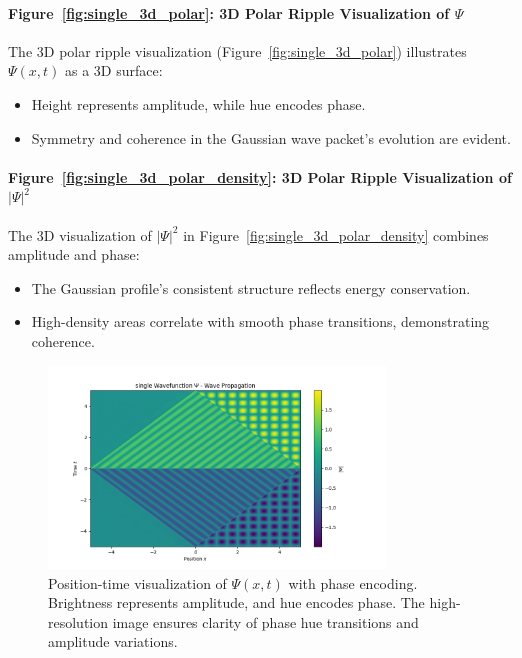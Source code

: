 \documentclass[12pt]{article}
\begin{document}
\paragraph{Figure~\ref{fig:single_3d_polar}: 3D Polar Ripple Visualization of \(\Psi\)}
The 3D polar ripple visualization (Figure~\ref{fig:single_3d_polar}) illustrates \(\Psi(x,t)\) as a 3D surface:
\begin{itemize}
    \item Height represents amplitude, while hue encodes phase.
    \item Symmetry and coherence in the Gaussian wave packet's evolution are evident.
\end{itemize}

\paragraph{Figure~\ref{fig:single_3d_polar_density}: 3D Polar Ripple Visualization of \(|\Psi|^2\)}
The 3D visualization of \(|\Psi|^2\) in Figure~\ref{fig:single_3d_polar_density} combines amplitude and phase:
\begin{itemize}
    \item The Gaussian profile's consistent structure reflects energy conservation.
    \item High-density areas correlate with smooth phase transitions, demonstrating coherence.
\end{itemize}

\begin{figure}[H]
    \centering
    \includegraphics[width=0.8\textwidth]{images/single_wavefunction.png}
    \caption{Position-time visualization of \(\Psi(x,t)\) with phase encoding. Brightness represents amplitude, and hue encodes phase. The high-resolution image ensures clarity of phase hue transitions and amplitude variations.}
    \label{fig:single_xt}
\end{figure}
\end{document}
